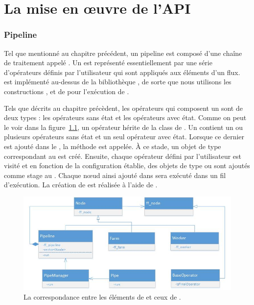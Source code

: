 
\chapter{La mise en \oe{}uvre de l'API}
\label{implementation.chap}



\subsection{Pipeline}

Tel que mentionn\'e au chapitre pr\'ec\'edent, un pipeline est compos\'e d'une cha\^ine de traitement appel\'e . Un  est repr\'esent\'e essentiellement par une s\'erie d'op\'erateurs d\'efinis par l'utilisateur qui sont appliqu\'es aux \'el\'ements d'un flux.  est impl\'ement\'e au-dessus de la biblioth\`eque , de sorte que nous utilisons les constructions ,  et  de  pour l'ex\'ecution de . 

Tels que d\'ecrits au chapitre pr\'ec\`edent, les op\'erateurs qui composent un  sont de deux types : les op\'erateurs sans \'etat et les op\'erateurs avec \'etat. Comme on peut le voir dans la figure~\ref{MapToFastFlow.fig}, un op\'erateur h\'erite de la class  de . Un  contient un ou plusieurs op\'erateurs sans \'etat et un seul op\'erateur avec \'etat. Lorsque ce dernier est ajout\'e dans le , la m\'ethode  est appel\'ee. \`A ce stade, un objet de type  correspondant au  est cr\'e\'e. Ensuite, chaque op\'erateur d\'efini par l'utilisateur est visit\'e et en fonction de la configuration \'etablie, des objets de type  ou  sont ajout\'es comme stage au . Chaque nœud ainsi ajout\'e dans  sera ex\'ecut\'e dans un fil d'ex\'ecution.
La cr\'eation de  est r\'ealis\'ee \`a l'aide de .

\begin{figure}[ht]
\centering
     \includegraphics[width=1.0\textwidth]{Figures/MapToFastFlow.jpg}
      \caption{La correspondance entre les \'el\'ements de  et ceux de  .}
       \label{MapToFastFlow.fig}
\end{figure}


